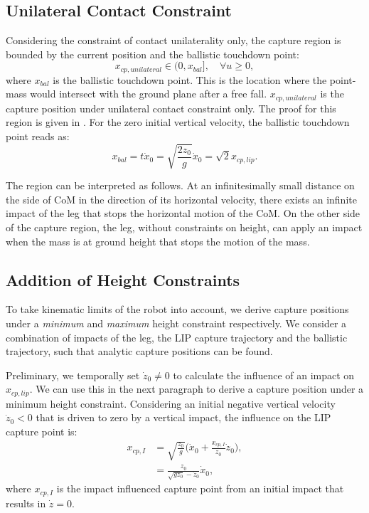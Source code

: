 \documentclass[letterpaper, 10 pt, conference]{ieeeconf}  %
\begin{document}
\subsection{Unilateral Contact Constraint}
 Considering the constraint of contact unilaterality only, the capture region is bounded by the current position and the ballistic touchdown point:
\begin{equation}
	x_{cp,unilateral} \in (0, x_{bal}], \quad \forall u \geq 0, 
	\label{eq:xcpuni}
\end{equation}
where $x_{bal}$ is the ballistic touchdown point. This is the location where the point-mass would intersect with the ground plane after a free fall. $x_{cp,unilateral}$ is the capture position under unilateral contact constraint only. The proof for this region is given in \cite{koolen2016balance}. For the zero initial vertical velocity, the ballistic touchdown point reads as:
\begin{equation}
 x_{bal}=t \dot{x}_0=\sqrt{\frac{2z_0}{g}}\dot{x}_0=\sqrt{2}x_{cp,lip}.
 	\label{eq:xbal}
\end{equation}

The region can be interpreted as follows. At an infinitesimally small distance on the side of CoM in the direction of its horizontal velocity, there exists an infinite impact of the leg that stops the horizontal motion of the CoM. On the other side of the capture region, the leg, without constraints on height, can apply an impact when the mass is at ground height that stops the motion of the mass.
\subsection{Addition of Height Constraints}
To take kinematic limits of the robot into account, we derive capture positions under a \textit{minimum} and \textit{maximum} height constraint respectively. We consider a combination of impacts of the leg, the LIP capture trajectory and the ballistic trajectory, such that analytic capture positions can be found. 

Preliminary, we temporally set $\dot{z}_0 \neq 0$ to calculate the influence of an impact on $x_{cp,lip}$. We can use this in the next paragraph to derive a capture position under a minimum height constraint. Considering an initial negative vertical velocity $\dot{z}_0<0$ that is driven to zero by a vertical impact, the influence on the LIP capture point is:
\begin{align}
	x_{cp,I} &= \sqrt{\frac{z_0}{g}}\Big(\dot{x}_0 + \frac{x_{cp,I}}{z_0}\dot{z}_0\Big),\\
	&=\frac{z_0}{\sqrt{gz_0}-\dot{z}_0}\dot{x}_0, \label{eq:xcpimpact}
\end{align}
where $x_{cp,I}$ is the impact influenced capture point from an initial impact that results in $\dot{z}=0$.
\end{document}
